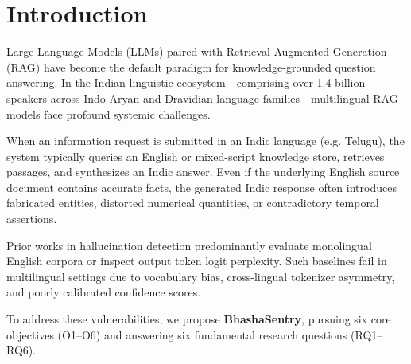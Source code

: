\section{Introduction}
Large Language Models (LLMs) paired with Retrieval-Augmented Generation (RAG) have become the default paradigm for knowledge-grounded question answering. In the Indian linguistic ecosystem---comprising over 1.4 billion speakers across Indo-Aryan and Dravidian language families---multilingual RAG models face profound systemic challenges.

When an information request is submitted in an Indic language (e.g. Telugu), the system typically queries an English or mixed-script knowledge store, retrieves passages, and synthesizes an Indic answer. Even if the underlying English source document contains accurate facts, the generated Indic response often introduces fabricated entities, distorted numerical quantities, or contradictory temporal assertions.

Prior works in hallucination detection predominantly evaluate monolingual English corpora or inspect output token logit perplexity. Such baselines fail in multilingual settings due to vocabulary bias, cross-lingual tokenizer asymmetry, and poorly calibrated confidence scores.

To address these vulnerabilities, we propose \textbf{BhashaSentry}, pursuing six core objectives (O1--O6) and answering six fundamental research questions (RQ1--RQ6).
